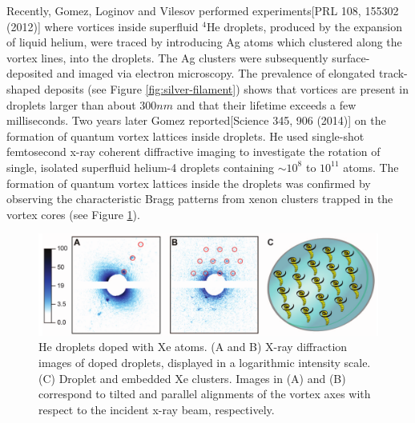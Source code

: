 	Recently, Gomez, Loginov and Vilesov performed experiments[PRL 108, 155302 (2012)] where vortices inside superfluid $^4$He droplets, produced by the expansion of liquid helium, were traced by introducing Ag atoms which clustered along the vortex lines, into the droplets. The Ag clusters were subsequently surface-deposited and imaged via electron microscopy. The prevalence of elongated track-shaped deposits (see Figure \ref{fig:silver-filament}) shows that vortices are present in droplets larger than about $300\unit{nm}$ and that their lifetime exceeds a few milliseconds. Two years later Gomez reported[Science 345, 906 (2014)] on the formation of quantum vortex lattices inside droplets. He used single-shot femtosecond x-ray coherent diffractive imaging to investigate the rotation of single, isolated superfluid helium-4 droplets containing $\sim\!10^8$ to $10^{11}$ atoms. The formation of quantum vortex lattices inside the droplets was confirmed by observing the characteristic Bragg patterns from xenon clusters trapped in the vortex cores (see Figure \ref{fig:vortex-array}).

	\begin{figure}[t]
		\begin{center}
			\includegraphics[width=\textwidth]{vortex-array}
			\caption{He droplets doped with Xe atoms. (A and B) X-ray diffraction images of doped droplets, displayed in a logarithmic intensity scale. (C) Droplet and embedded Xe clusters. Images in (A) and (B) correspond to tilted and parallel alignments of the vortex axes with respect to the incident x-ray beam, respectively.}
			\label{fig:vortex-array}
		\end{center}
	\end{figure}
	
